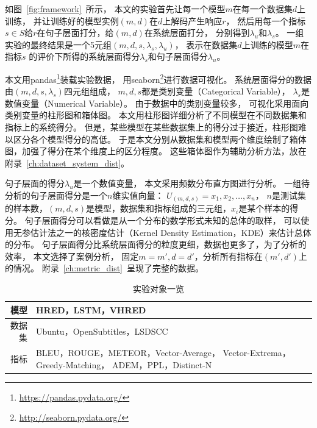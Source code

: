 如图~\ref{fig:framework}~所示，
本文的实验首先让每一个模型$m$在每一个数据集$d$上训练，
并让训练好的模型实例$(m, d)$在$d$上解码产生响应$r$，
然后用每一个指标$s \in S$给$r$在句子层面打分，给$(m, d)$在系统层面打分，
分别得到$\lambda_{u}$和$\lambda_{s}$。
一组实验的最终结果是一个5元组$(m, d, s, \lambda_{s}, \lambda_{u})$，
表示在数据集$d$上训练的模型$m$在指标$s$
的评价下所得的系统层面得分$\lambda_s$和句子层面得分$\lambda_u$。

本文用pandas\footnote{\url{https://pandas.pydata.org/}}装载实验数据，
用seaborn\footnote{\url{http://seaborn.pydata.org/}}进行数据可视化。
系统层面得分的数据由$(m, d, s, \lambda_s)$四元组组成，
$m, d, s$都是类别变量（Categorical Variable），
$\lambda_s$是数值变量（Numerical Variable）。
由于数据中的类别变量较多，
可视化采用面向类别变量的柱形图和箱体图。
本文用柱形图详细分析了不同模型在不同数据集和指标上的系统得分。
但是，某些模型在某些数据集上的得分过于接近，柱形图难以区分各个模型得分的高低。
于是本文分别从数据集和模型两个维度绘制了箱体图，加强了得分在某个维度上的区分程度。
这些箱体图作为辅助分析方法，放在附录~\ref{ch:dataset_system_dist}。

句子层面的得分$\lambda_u$是一个数值变量，
本文采用频数分布直方图进行分析。
一组待分析的句子层面得分是一个$n$维实值向量： $U_{(m, d, s)} = x_1, x_2, \dots, x_n$，
$n$是测试集的样本数，$(m, d, s)$是模型，数据集和指标组成的三元组，$x_i$是某个样本的得分。
句子层面得分可以看做是从一个分布的数学形式未知的总体的取样，
可以使用无参估计法之一的核密度估计（Kernel Density Estimation，KDE）来估计总体的分布。
句子层面得分比系统层面得分的粒度更细，数据也更多了，为了分析的效率，
本文选择了案例分析，
固定$m = m', d = d'$，分析所有指标在$(m', d')$上的情况。
附录~\ref{ch:metric_dist}~呈现了完整的数据。

\begin{table}[H]
    \centering
    \caption{实验对象一览}
    \label{tab:experiment_triples}
    \begin{tabular}{|r|m{}|}
        \hline
        模型 & HRED，LSTM，VHRED \\
        \hline
        数据集 & Ubuntu，OpenSubtitles，LSDSCC \\
        \hline
        指标 & BLEU，ROUGE，METEOR，Vector-Average，
        Vector-Extrema，Greedy-Matching，
        ADEM，PPL，Distinct-N \\
        \hline
    \end{tabular}
\end{table}

